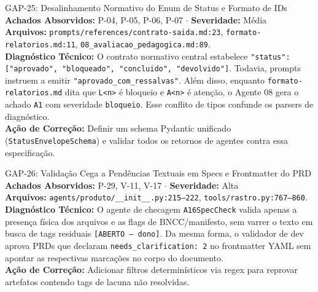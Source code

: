 \documentclass[11pt,a4paper]{article}
\begin{document}
\begin{gapbox}{GAP-25: Desalinhamento Normativo do Enum de Status e Formato de IDs}
\textbf{Achados Absorvidos:} P-04, P-05, P-06, P-07 $\cdot$ \textbf{Severidade:} Média\\
\textbf{Arquivos:} \texttt{prompts/references/contrato-saida.md:23}, \texttt{formato-relatorios.md:11}, \texttt{08\_avaliacao\_pedagogica.md:89}.\\
\textbf{Diagnóstico Técnico:} O contrato normativo central estabelece \texttt{"status": ["aprovado", "bloqueado", "concluido", "devolvido"]}. Todavia, prompts instruem a emitir \texttt{"aprovado\_com\_ressalvas"}. Além disso, enquanto \texttt{formato-relatorios.md} dita que \texttt{L<n>} é bloqueio e \texttt{A<n>} é atenção, o Agente 08 gera o achado \texttt{A1} com severidade \texttt{bloqueio}. Esse conflito de tipos confunde os parsers de diagnóstico.\\
\textbf{Ação de Correção:} Definir um schema Pydantic unificado (\texttt{StatusEnvelopeSchema}) e validar todos os retornos de agentes contra essa especificação.
\end{gapbox}

\begin{gapbox}{GAP-26: Validação Cega a Pendências Textuais em Specs e Frontmatter do PRD}
\textbf{Achados Absorvidos:} P-29, V-11, V-17 $\cdot$ \textbf{Severidade:} Alta\\
\textbf{Arquivos:} \texttt{agents/produto/\_\_init\_\_.py:215--222}, \texttt{tools/rastro.py:767--860}.\\
\textbf{Diagnóstico Técnico:} O agente de checagem \texttt{A16SpecCheck} valida apenas a presença física dos arquivos e as flags de BNCC/manifesto, sem varrer o texto em busca de tags residuais \texttt{[ABERTO --- dono]}. Da mesma forma, o validador de dev aprova PRDs que declaram \texttt{needs\_clarification: 2} no frontmatter YAML sem apontar as respectivas marcações no corpo do documento.\\
\textbf{Ação de Correção:} Adicionar filtros determinísticos via regex para reprovar artefatos contendo tags de lacuna não resolvidas.
\end{gapbox}
\end{document}
